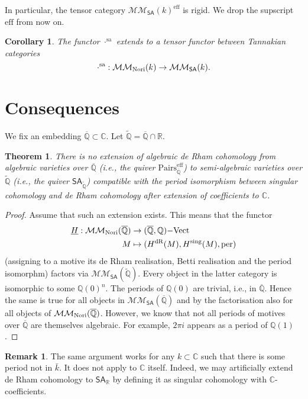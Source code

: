 \documentclass[11pt,a4paper]{amsart}
\newtheorem{thm}[lemma]{Theorem}
\newtheorem{cor}[lemma]{Corollary}
\theoremstyle{definition}
\newtheorem{rem}[lemma]{Remark}
\newcommand{\Vect}{\mathrm{-Vect}}
\newcommand{\MMN}{\mathcal{MM}_{\rm Nori}}
\newcommand{\MMSA}{\mathcal{MM}_{\SA}}
\newcommand{\eff}{\mathrm{eff}}
\newcommand{\dR}{\mathrm{dR}}
\newcommand{\sa}{\mathrm{sa}}
\newcommand{\VValg}{(\Qbar,\Q)\Vect}
\newcommand{\sing}{\mathrm{sing}}
\newcommand{\pairs}{\mathrm{Pairs}}
\newcommand{\SA}{\mathsf{SA}}
\newcommand{\pairseff}{\pairs^\eff}
\newcommand{\Q}{\mathbb{Q}}
\newcommand{\Qbar}{{\overline{\Q}}}
\newcommand{\Qtilde}{{\widetilde{\Q}}}
\newcommand{\R}{\mathbb{R}}
\newcommand{\C}{\mathbb{C}}
\newcommand{\ul}[1]{\underline{#1}}
\begin{document}
In particular, the tensor category $\MMSA(k)^\eff$ is rigid. We drop the
supscript $\eff$ from now on.

\begin{cor}The functor $\cdot^\sa$ extends to a tensor functor between Tannakian categories
\[ \cdot^\sa:\MMN(k)\to \MMSA(k).\]
\end{cor}






\section{Consequences}

We fix an embedding $\Qbar\subset\C$. Let $\Qtilde=\Qbar\cap\R$.

\begin{thm}There is no extension of algebraic de Rham cohomology from
algebraic varieties over $\Qbar$ (i.e., the quiver $\pairseff_\Qbar$)
to semi-algebraic varieties over $\Qtilde$ (i.e., the quiver
$\SA_\Qtilde$) compatible with the period isomorphism between singular cohomology and de Rham cohomology after extension of coefficients to $\C$.
\end{thm}
\begin{proof}
Assume that such an extension exists. This means that the functor
\begin{align*} \ul{H}:\MMN(\Qbar)&\to \VValg\\
                            M&\mapsto (H^\dR(M),H^\sing(M),\mathrm{per})
\end{align*}
(assigning to a motive its de Rham realisation, Betti realisation and the period isomorphm)
factors via $\MMSA(\Qtilde)$. Every object in the latter category is
isomorphic to some $\Q(0)^n$. The periods of $\Q(0)$ are trivial, i.e., in
$\Qbar$. Hence the same is true for all objects in $\MMSA(\Qbar)$ and by the factorisation also for all objects of $\MMN(\Qbar)$.  However, we know that not all periods of motives over $\Qbar$ are themselves algebraic. For example, $2\pi i$ appears as a period of $\Q(1)$.
\end{proof}

\begin{rem}The same argument works for any $k\subset\C$ such that there
is some period not in $\bar{k}$. It does not apply to $\C$ itself. Indeed, we may artificially extend de Rham cohomology to $\SA_\R$ by defining it as singular cohomology with $\C$-coefficients.
\end{rem}
\end{document}
